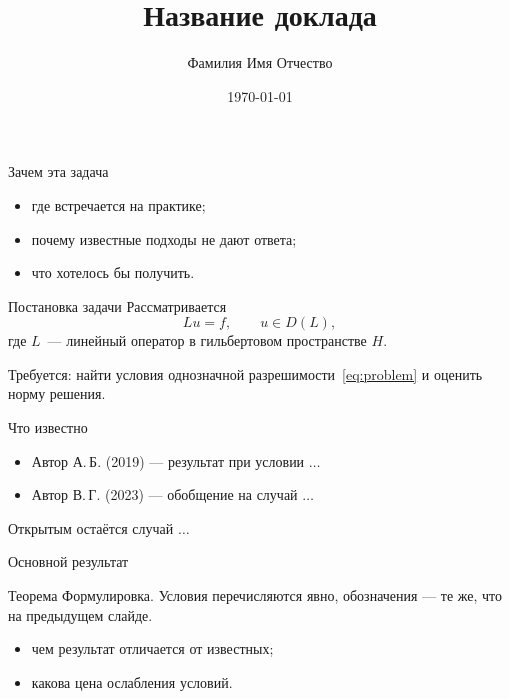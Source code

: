 \documentclass[aspectratio=169, 12pt]{beamer}
\title[Краткое название]{Название доклада}
\author[Фамилия И.\,О.]{Фамилия Имя Отчество}
\institute[ФН1]{Лаборатория математики ФН1}
\date{\today}
\begin{document}
\begin{frame}[plain]
  \titlepage
\end{frame}

\begin{frame}{Зачем эта задача}
  \begin{itemize}
    \item где встречается на практике;
    \item почему известные подходы не дают ответа;
    \item что хотелось бы получить.
  \end{itemize}
\end{frame}

\begin{frame}{Постановка задачи}
  Рассматривается
  \begin{equation}\label{eq:problem}
    L u = f, \qquad u \in D(L),
  \end{equation}
  где $L$~--- линейный оператор в гильбертовом пространстве $H$.

  \vspace{0.6em}
  \alert{Требуется:} найти условия однозначной разрешимости~\eqref{eq:problem}
  и оценить норму решения.
\end{frame}

\begin{frame}{Что известно}
  \begin{itemize}
    \item[{[1]}] Автор А.\,Б. (2019) --- результат при условии $\ldots$
    \item[{[2]}] Автор В.\,Г. (2023) --- обобщение на случай $\ldots$
  \end{itemize}

  \vspace{0.6em}
  Открытым остаётся случай $\ldots$
\end{frame}

\begin{frame}{Основной результат}
  \begin{block}{Теорема}
    Формулировка. Условия перечисляются явно, обозначения --- те же,
    что на предыдущем слайде.
  \end{block}

  \vspace{0.6em}
  \begin{itemize}
    \item чем результат отличается от известных;
    \item какова цена ослабления условий.
  \end{itemize}
\end{frame}
\end{document}
